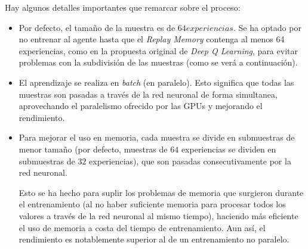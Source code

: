 Hay algunos detalles importantes que remarcar sobre el proceso:
\begin{itemize}
	\item Por defecto, el tamaño de la muestra es de $64 experiencias$. Se ha optado por no entrenar al agente hasta que el \textit{Replay Memory} contenga al menos 64 experiencias, como en la propuesta original de \textit{Deep Q Learning}, para evitar problemas con la subdivisión de las muestras (como se verá a continuación).
	\item El aprendizaje se realiza en \textit{batch} (en paralelo). Esto significa que todas las muestras son pasadas a través de la red neuronal de forma simultanea, aprovechando el paralelismo ofrecido por las GPUs y mejorando el rendimiento.
	\item Para mejorar el uso en memoria, cada muestra se divide en submuestras de menor tamaño (por defecto, muestras de $64$ experiencias se dividen en submuestras de $32$ experiencias), que son pasadas consecutivamente por la red neuronal.
	
	Esto se ha hecho para suplir los problemas de memoria que surgieron durante el entrenamiento (al no haber suficiente memoria para procesar todos los valores a través de la red neuronal al mismo tiempo), haciendo más eficiente el uso de memoria a costa del tiempo de entrenamiento. Aun así, el rendimiento es notablemente superior al de un entrenamiento no paralelo.
\end{itemize}

